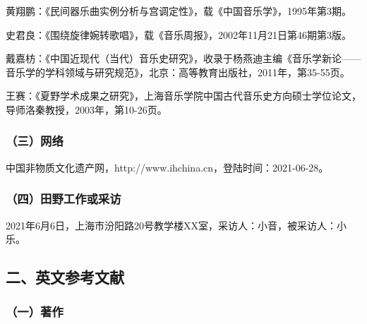 \begin{achievements}
\item 黄翔鹏：《民间器乐曲实例分析与宫调定性》，载《中国音乐学》，1995年第3期。
\item 史君良：《围绕旋律婉转歌唱》，载《音乐周报》，2002年11月21日第46期第3版。
\item 戴嘉枋：《中国近现代（当代）音乐史研究》，收录于杨燕迪主编《音乐学新论——音乐学的学科领域与研究规范》，北京：高等教育出版社，2011年，第35-55页。
\item 王赛：《夏野学术成果之研究》，上海音乐学院中国古代音乐史方向硕士学位论文，导师洛秦教授，2003年，第10-26页。
\end{achievements}

\subsubsection*{（三）网络}

\begin{achievements}
\item 中国非物质文化遗产网，http://www.ihchina.cn，登陆时间：2021-06-28。
\end{achievements}

\subsubsection*{（四）田野工作或采访}

\begin{achievements}
	\item 2021年6月6日，上海市汾阳路20号教学楼XX室，采访人：小音，被采访人：小乐。
\end{achievements}


\subsection*{二、英文参考文献}

\subsubsection*{（一）著作}
% 

